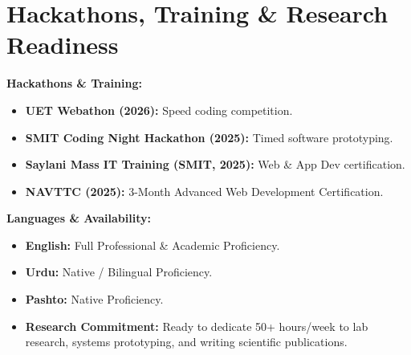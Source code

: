 \documentclass[10pt,a4paper]{article}
\begin{document}
\section{Hackathons, Training \& Research Readiness}
\begin{minipage}[t]{0.48\textwidth}
    \textbf{Hackathons \& Training:}
    \begin{itemize}
        \item \textbf{UET Webathon (2026):} Speed coding competition.
        \item \textbf{SMIT Coding Night Hackathon (2025):} Timed software prototyping.
        \item \textbf{Saylani Mass IT Training (SMIT, 2025):} Web \& App Dev certification.
        \item \textbf{NAVTTC (2025):} 3-Month Advanced Web Development Certification.
    \end{itemize}
\end{minipage}
\hfill
\begin{minipage}[t]{0.48\textwidth}
    \textbf{Languages \& Availability:}
    \begin{itemize}
        \item \textbf{English:} Full Professional \& Academic Proficiency.
        \item \textbf{Urdu:} Native / Bilingual Proficiency.
        \item \textbf{Pashto:} Native Proficiency.
        \item \textbf{Research Commitment:} Ready to dedicate 50+ hours/week to lab research, systems prototyping, and writing scientific publications.
    \end{itemize}
\end{minipage}
\end{document}
